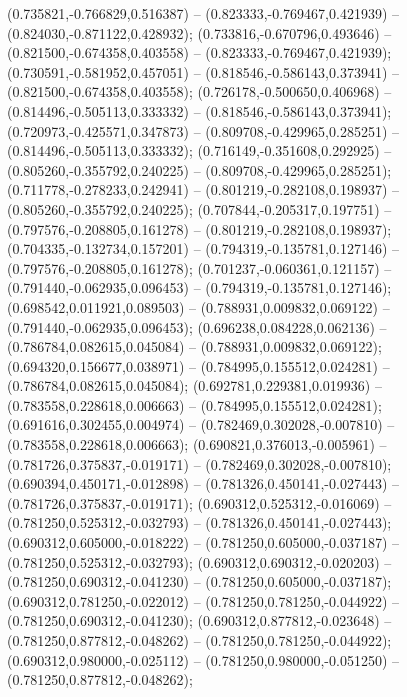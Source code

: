  (0.735821,-0.766829,0.516387) -- (0.823333,-0.769467,0.421939) -- (0.824030,-0.871122,0.428932);
 (0.733816,-0.670796,0.493646) -- (0.821500,-0.674358,0.403558) -- (0.823333,-0.769467,0.421939);
 (0.730591,-0.581952,0.457051) -- (0.818546,-0.586143,0.373941) -- (0.821500,-0.674358,0.403558);
 (0.726178,-0.500650,0.406968) -- (0.814496,-0.505113,0.333332) -- (0.818546,-0.586143,0.373941);
 (0.720973,-0.425571,0.347873) -- (0.809708,-0.429965,0.285251) -- (0.814496,-0.505113,0.333332);
 (0.716149,-0.351608,0.292925) -- (0.805260,-0.355792,0.240225) -- (0.809708,-0.429965,0.285251);
 (0.711778,-0.278233,0.242941) -- (0.801219,-0.282108,0.198937) -- (0.805260,-0.355792,0.240225);
 (0.707844,-0.205317,0.197751) -- (0.797576,-0.208805,0.161278) -- (0.801219,-0.282108,0.198937);
 (0.704335,-0.132734,0.157201) -- (0.794319,-0.135781,0.127146) -- (0.797576,-0.208805,0.161278);
 (0.701237,-0.060361,0.121157) -- (0.791440,-0.062935,0.096453) -- (0.794319,-0.135781,0.127146);
 (0.698542,0.011921,0.089503) -- (0.788931,0.009832,0.069122) -- (0.791440,-0.062935,0.096453);
 (0.696238,0.084228,0.062136) -- (0.786784,0.082615,0.045084) -- (0.788931,0.009832,0.069122);
 (0.694320,0.156677,0.038971) -- (0.784995,0.155512,0.024281) -- (0.786784,0.082615,0.045084);
 (0.692781,0.229381,0.019936) -- (0.783558,0.228618,0.006663) -- (0.784995,0.155512,0.024281);
 (0.691616,0.302455,0.004974) -- (0.782469,0.302028,-0.007810) -- (0.783558,0.228618,0.006663);
 (0.690821,0.376013,-0.005961) -- (0.781726,0.375837,-0.019171) -- (0.782469,0.302028,-0.007810);
 (0.690394,0.450171,-0.012898) -- (0.781326,0.450141,-0.027443) -- (0.781726,0.375837,-0.019171);
 (0.690312,0.525312,-0.016069) -- (0.781250,0.525312,-0.032793) -- (0.781326,0.450141,-0.027443);
 (0.690312,0.605000,-0.018222) -- (0.781250,0.605000,-0.037187) -- (0.781250,0.525312,-0.032793);
 (0.690312,0.690312,-0.020203) -- (0.781250,0.690312,-0.041230) -- (0.781250,0.605000,-0.037187);
 (0.690312,0.781250,-0.022012) -- (0.781250,0.781250,-0.044922) -- (0.781250,0.690312,-0.041230);
 (0.690312,0.877812,-0.023648) -- (0.781250,0.877812,-0.048262) -- (0.781250,0.781250,-0.044922);
 (0.690312,0.980000,-0.025112) -- (0.781250,0.980000,-0.051250) -- (0.781250,0.877812,-0.048262);
